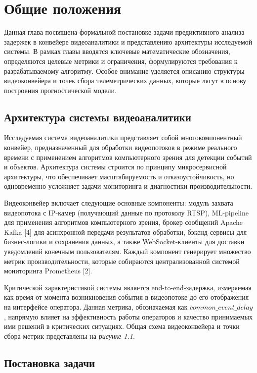 \chapter{Общие положения}

Данная глава посвящена формальной постановке задачи предиктивного анализа задержек в конвейере видеоаналитики и представлению архитектуры исследуемой системы. В рамках главы вводятся ключевые математические обозначения, определяются целевые метрики и ограничения, формулируются требования к разрабатываемому алгоритму. Особое внимание уделяется описанию структуры видеоконвейера и точек сбора телеметрических данных, которые лягут в основу построения прогностической модели.

\section{Архитектура системы видеоаналитики}

Исследуемая система видеоаналитики представляет собой многокомпонентный конвейер, предназначенный для обработки видеопотоков в режиме реального времени с применением алгоритмов компьютерного зрения для детекции событий и объектов. Архитектура системы строится по принципу микросервисной архитектуры, что обеспечивает масштабируемость и отказоустойчивость, но одновременно усложняет задачи мониторинга и диагностики производительности.

Видеоконвейер включает следующие основные компоненты: модуль захвата видеопотока с IP-камер (получающий данные по протоколу RTSP), ML-pipeline для применения алгоритмов компьютерного зрения, брокер сообщений Apache Kafka [4] для асинхронной передачи результатов обработки, бэкенд-сервисы для бизнес-логики и сохранения данных, а также WebSocket-клиенты для доставки уведомлений конечным пользователям. Каждый компонент генерирует множество метрик производительности, которые собираются централизованной системой мониторинга Prometheus [2].

Критической характеристикой системы является end-to-end-задержка, измеряемая как время от момента возникновения события в видеопотоке до его отображения на интерфейсе оператора. Данная метрика, обозначаемая как $common\_event\_delay$, напрямую влияет на эффективность работы операторов и качество принимаемых ими решений в критических ситуациях. Общая схема видеоконвейера и точки сбора метрик представлены на \textit{рисунке 1.1}.

\section{Постановка задачи}

